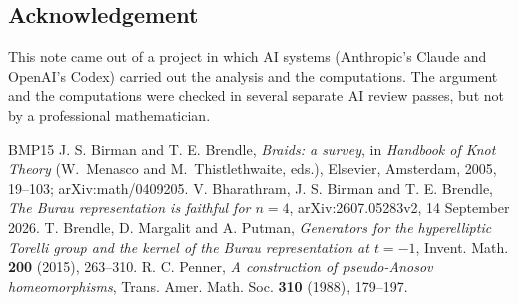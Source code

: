 \documentclass[11pt]{amsart}
\theoremstyle{remark}
\begin{document}
\subsection*{Acknowledgement}
This note came out of a project in which AI systems (Anthropic's Claude and OpenAI's Codex) carried out the analysis and the computations. The argument and the computations were checked in several separate AI review passes, but not by a professional mathematician.

\begin{thebibliography}{BMP15}
 J. S. Birman and T. E. Brendle, \emph{Braids: a survey}, in \emph{Handbook of Knot Theory} (W.~Menasco and M.~Thistlethwaite, eds.), Elsevier, Amsterdam, 2005, 19--103; arXiv:math/0409205.
 V. Bharathram, J. S. Birman and T. E. Brendle, \emph{The Burau representation is faithful for $n=4$}, arXiv:2607.05283v2, 14 September 2026.
 T. Brendle, D. Margalit and A. Putman, \emph{Generators for the hyperelliptic Torelli group and the kernel of the Burau representation at $t=-1$}, Invent. Math. \textbf{200} (2015), 263--310.
 R. C. Penner, \emph{A construction of pseudo-Anosov homeomorphisms}, Trans. Amer. Math. Soc. \textbf{310} (1988), 179--197.
\end{thebibliography}
\end{document}
